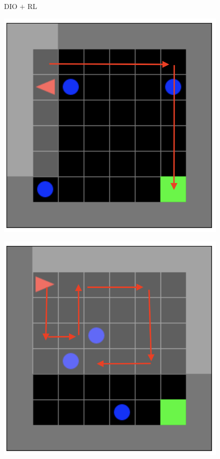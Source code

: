   \begin{figure}
    \centering
    
    \begin{minipage}{.5\textwidth}  
      \centering 
      \textsc{DIO $+$ RL}
    \end{minipage}%
    \begin{minipage}{.5\textwidth}
      \centering
    \end{minipage}
    \vspace{0.2cm}

      \begin{minipage}{.5\textwidth}
        \centering
        \includegraphics[width=0.7\linewidth]{figures/diopolicy.png}
        \label{fig:policydio}
      \end{minipage}%
      \begin{minipage}{.5\textwidth}
        \centering
        \includegraphics[width=0.7\linewidth]{figures/rlpolicy.png}

\end{minipage}
\end{figure}
